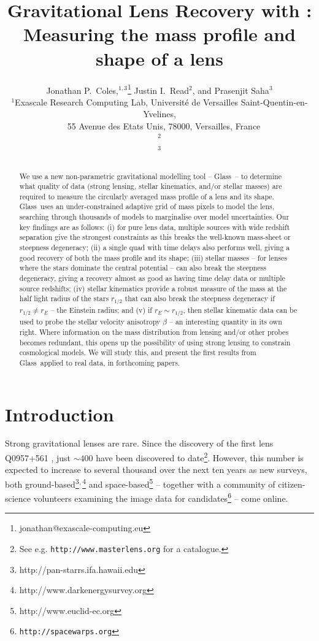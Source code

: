 \documentclass[galley,usenatbib]{mn2e}
\title[Lens Recovery with \Glass]{Gravitational Lens Recovery with \Glass: Measuring the mass profile and shape of a lens}
\author[J.~P.~Coles~et~al.]{%
Jonathan P.~Coles,$^{1,3}$\thanks{jonathan@exascale-computing.eu}%
\newauthor%
Justin I.~Read$^2$,%
\newauthor%
and Prasenjit Saha$^3$%
%
\\
$^1$Exascale Research Computing Lab, Universit\'e de Versailles Saint-Quentin-en-Yvelines,\\$\quad$55 Avenue des Etats Unis, 78000, Versailles, France\\
$^2$\hilight{Department of Physics, University of Surrey, Guildford, Surrey, GU2 7XH, United Kingdom} \\
$^3$\hilight{Institute of Physics, University of Zurich, 190 Winterthurerstrasse, 8057, Zurich, Switzerland}
}
\newcommand{\Glass}{{\sc Glass}}
\begin{document}
\maketitle

\begin{abstract}
We use a new non-parametric gravitational modelling tool -- \Glass\ -- to
determine what quality of data (strong lensing, stellar kinematics, and/or
stellar masses) are required to measure the circularly averaged mass profile of
a lens and its shape. \Glass\ uses an under-constrained adaptive grid of mass
pixels to model the lens, searching through thousands of models to marginalise
over model uncertainties. Our key findings are as follows: (i) for pure lens
data, multiple sources with wide redshift separation give the strongest
constraints as this breaks the well-known mass-sheet or steepness degeneracy;
(ii) a single quad with time delays also performs well, giving a good recovery
of both the mass profile and its shape; (iii) stellar masses -- for lenses
where the stars dominate the central potential -- can also break the steepness
degeneracy, giving a recovery almost as good as having time delay data or
multiple source redshifts; (iv) stellar kinematics provide a robust measure of the mass at the half light radius of the stars $r_{1/2}$ that can also break the steepness degeneracy if $r_{1/2} \neq r_E$ -- the Einstein radius; and (v) if $r_E \sim r_{1/2}$, then stellar kinematic data can be used to probe the stellar velocity anisotropy 
$\beta$ -- an interesting quantity in its own right. Where
information on the mass distribution from lensing and/or other probes becomes
redundant, this opens up the possibility of using strong lensing to constrain
cosmological models. We will study this, and present the first results from
\Glass\ applied to real data, in forthcoming papers.
\end{abstract}

\section{Introduction}\label{sec:intro}

Strong gravitational lenses are rare. Since the discovery of the first lens Q0957+561 \citep{1979Natur.279..381W}, just $\sim400$ have been discovered to date\footnote{See e.g. {\tt http://www.masterlens.org} for a catalogue.}. However, this number is expected to increase to
several thousand over the next ten years as new surveys, both
ground-based\footnote{http://pan-starrs.ifa.hawaii.edu}$^{\rm,}$\footnote{http://www.darkenergysurvey.org}
and space-based\footnote{http://www.euclid-ec.org} -- together with a
community of citizen-science volunteers examining the image data for
candidates\footnote{{\tt http://spacewarps.org}} -- come online. 
\end{document}
